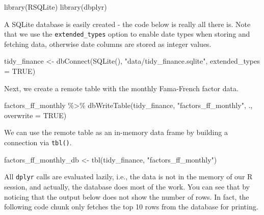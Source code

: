 \documentclass[
]{krantz}
\newenvironment{Shaded}{\begin{snugshade}}{\end{snugshade}}
\newcommand{\AttributeTok}[1]{\textcolor[rgb]{0.61,0.61,0.61}{#1}}
\newcommand{\ConstantTok}[1]{\textcolor[rgb]{0,0,0}{#1}}
\newcommand{\FunctionTok}[1]{\textcolor[rgb]{0,0,0}{#1}}
\newcommand{\NormalTok}[1]{#1}
\newcommand{\OtherTok}[1]{\textcolor[rgb]{0.37,0.37,0.37}{#1}}
\newcommand{\SpecialCharTok}[1]{\textcolor[rgb]{0,0,0}{#1}}
\newcommand{\StringTok}[1]{\textcolor[rgb]{0.5,0.5,0.5}{#1}}
\begin{document}
\begin{Shaded}
\begin{Highlighting}[]
\FunctionTok{library}\NormalTok{(RSQLite)}
\FunctionTok{library}\NormalTok{(dbplyr)}
\end{Highlighting}
\end{Shaded}

A SQLite database is easily created - the code below is really all there is. Note that we use the \texttt{extended\_types} option to enable date types when storing and fetching data, otherwise date columns are stored as integer values.

\begin{Shaded}
\begin{Highlighting}[]
\NormalTok{tidy\_finance }\OtherTok{\textless{}{-}} \FunctionTok{dbConnect}\NormalTok{(}\FunctionTok{SQLite}\NormalTok{(), }\StringTok{"data/tidy\_finance.sqlite"}\NormalTok{, }
                          \AttributeTok{extended\_types =} \ConstantTok{TRUE}\NormalTok{)}
\end{Highlighting}
\end{Shaded}

Next, we create a remote table with the monthly Fama-French factor data.

\begin{Shaded}
\begin{Highlighting}[]
\NormalTok{factors\_ff\_monthly }\SpecialCharTok{\%\textgreater{}\%}
  \FunctionTok{dbWriteTable}\NormalTok{(tidy\_finance, }\StringTok{"factors\_ff\_monthly"}\NormalTok{, ., }\AttributeTok{overwrite =} \ConstantTok{TRUE}\NormalTok{)}
\end{Highlighting}
\end{Shaded}

We can use the remote table as an in-memory data frame by building a connection via \texttt{tbl()}.

\begin{Shaded}
\begin{Highlighting}[]
\NormalTok{factors\_ff\_monthly\_db }\OtherTok{\textless{}{-}} \FunctionTok{tbl}\NormalTok{(tidy\_finance, }\StringTok{"factors\_ff\_monthly"}\NormalTok{)}
\end{Highlighting}
\end{Shaded}

All \texttt{dplyr} calls are evaluated lazily, i.e., the data is not in the memory of our R session, and actually, the database does most of the work. You can see that by noticing that the output below does not show the number of rows. In fact, the following code chunk only fetches the top 10 rows from the database for printing.
\end{document}
